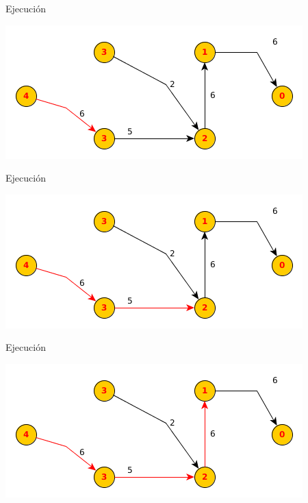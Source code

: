\documentclass{beamer}
\begin{document}
\begin{frame}{Ejecución}

    
    \includegraphics[scale=0.6]{dinitz/dinitz21.png}
    
\end{frame}

\begin{frame}{Ejecución}

    
    \includegraphics[scale=0.6]{dinitz/dinitz22.png}
    
\end{frame}

\begin{frame}{Ejecución}

    \includegraphics[scale=0.6]{dinitz/dinitz23.png}
    
\end{frame}
\end{document}

